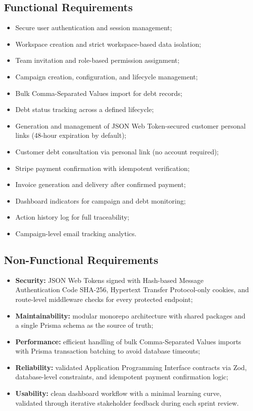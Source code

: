 ﻿\documentclass[12pt,a4paper]{report}
\begin{document}
\subsection{Functional Requirements}

\begin{itemize}
  \item Secure user authentication and session management;
  \item Workspace creation and strict workspace-based data isolation;
  \item Team invitation and role-based permission assignment;
  \item Campaign creation, configuration, and lifecycle management;
  \item Bulk Comma-Separated Values import for debt records;
  \item Debt status tracking across a defined lifecycle;
  \item Generation and management of JSON Web Token-secured customer personal links (48-hour expiration by default);
  \item Customer debt consultation via personal link (no account required);
  \item Stripe payment confirmation with idempotent verification;
  \item Invoice generation and delivery after confirmed payment;
  \item Dashboard indicators for campaign and debt monitoring;
  \item Action history log for full traceability;
  \item Campaign-level email tracking analytics.
\end{itemize}

\subsection{Non-Functional Requirements}

\begin{itemize}
  \item \textbf{Security:} JSON Web Tokens signed with Hash-based Message Authentication Code SHA-256, Hypertext Transfer Protocol-only cookies,
        and route-level middleware checks for every protected endpoint;
  \item \textbf{Maintainability:} modular monorepo architecture with shared packages
        and a single Prisma schema as the source of truth;
  \item \textbf{Performance:} efficient handling of bulk Comma-Separated Values imports with Prisma
        transaction batching to avoid database timeouts;
  \item \textbf{Reliability:} validated Application Programming Interface contracts via Zod, database-level constraints,
        and idempotent payment confirmation logic;
  \item \textbf{Usability:} clean dashboard workflow with a minimal learning curve,
        validated through iterative stakeholder feedback during each sprint review.
\end{itemize}
\end{document}
